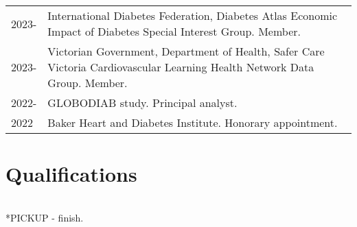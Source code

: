 \documentclass[11pt]{article}
\begin{document}
\begin{tabular}{p{2cm}p{14cm}}
2023- & International Diabetes Federation, Diabetes Atlas Economic Impact of Diabetes Special Interest Group. Member. \\
2023- & Victorian Government, Department of Health, 
Safer Care Victoria Cardiovascular Learning Health Network Data Group. Member. \\
2022- & GLOBODIAB study. Principal analyst.  \\
2022 & Baker Heart and Diabetes Institute. Honorary appointment.  \\
\end{tabular}

\section*{Qualifications}
\begin{tabular}{p{2cm}p{14cm}}

\end{tabular}

*PICKUP - finish. 


\color{white}
\cite{MortonDLOGIA2023}
\color{black}

\clearpage

\end{document}
